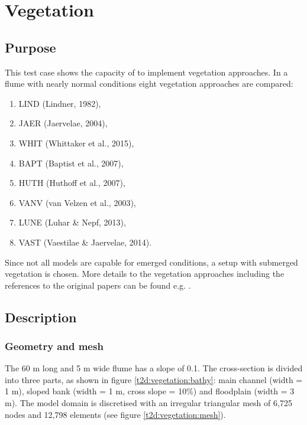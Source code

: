 \chapter{Vegetation}
%


\section{Purpose}
This test case shows the capacity of  to implement vegetation approaches.
In a flume with nearly normal conditions eight vegetation approaches are compared:
\begin{enumerate}
\item LIND (Lindner, 1982),
\item JAER (Jaervelae, 2004),
\item WHIT (Whittaker et al., 2015),
\item BAPT (Baptist et al., 2007),
\item HUTH (Huthoff et al., 2007),
\item VANV (van Velzen et al., 2003),
\item LUNE (Luhar \& Nepf, 2013),
\item VAST (Vaestilae \& Jaervelae, 2014).
\end{enumerate}

Since not all models are capable for emerged conditions, a setup with submerged
vegetation is chosen.
More details to the vegetation approaches including the references to the
original papers can be found e.g. \cite{folke2019vegetation}.


\section{Description}

\subsection{Geometry and mesh}

The 60 m long and 5 m wide flume has a slope of 0.1\textperthousand.
The cross-section is divided into three parts, as shown in figure
\ref{t2d:vegetation:bathy}:
main channel (width = 1 m), sloped bank (width = 1 m, cross slope = 10\%) and
floodplain (width = 3 m).
The model domain is discretised with an irregular triangular mesh of 6,725 nodes
and 12,798 elements (see figure \ref{t2d:vegetation:mesh}).

